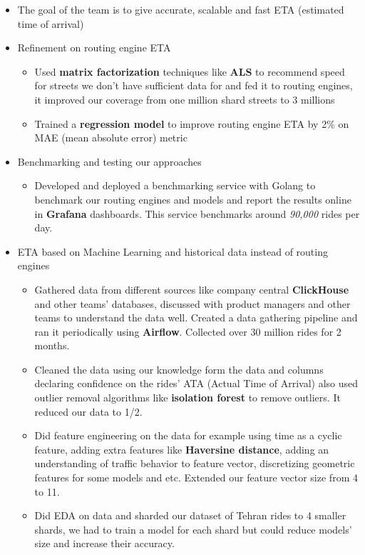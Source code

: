 \begin{itemize}
  \item The goal of the team is to give accurate, scalable and fast ETA (estimated time of arrival)
  \item Refinement on routing engine ETA
  \begin{itemize}
    \item Used \textbf{matrix factorization} techniques like \textbf{ALS} to recommend speed for streets we don't have sufficient data for and fed it to routing engines, it improved our coverage from one million shard streets to 3 millions
    \item Trained a \textbf{regression model} to improve routing engine ETA by 2\% on MAE (mean absolute error) metric
  \end{itemize}
  \item Benchmarking and testing our approaches
  \begin{itemize}
    \item Developed and deployed a benchmarking service with Golang to benchmark our routing engines and models and report the results online in \textbf{Grafana} dashboards. This service benchmarks around \textit{90,000} rides per day.
  \end{itemize}
  \item ETA based on Machine Learning and historical data instead of routing engines
  \begin{itemize}
    \item Gathered data from different sources like company central \textbf{ClickHouse} and other teams' databases, discussed with product managers and other teams to understand the data well. Created a data gathering pipeline and ran it periodically using \textbf{Airflow}. Collected over 30 million rides for 2 months.
    \item Cleaned the data using our knowledge form the data and columns declaring confidence on the rides' ATA (Actual Time of Arrival) also used outlier removal algorithms like \textbf{isolation forest} to remove outliers. It reduced our data to 1/2.
    \item Did feature engineering on the data for example using time as a cyclic feature, adding extra features like \textbf{Haversine distance}, adding an understanding of traffic behavior to feature vector, discretizing geometric features for some models and etc. Extended our feature vector size from 4 to 11.
    \item Did EDA on data and sharded our dataset of Tehran rides to 4 smaller shards, we had to train a model for each shard but could reduce models' size and increase their accuracy.

\end{itemize}
\end{itemize}
